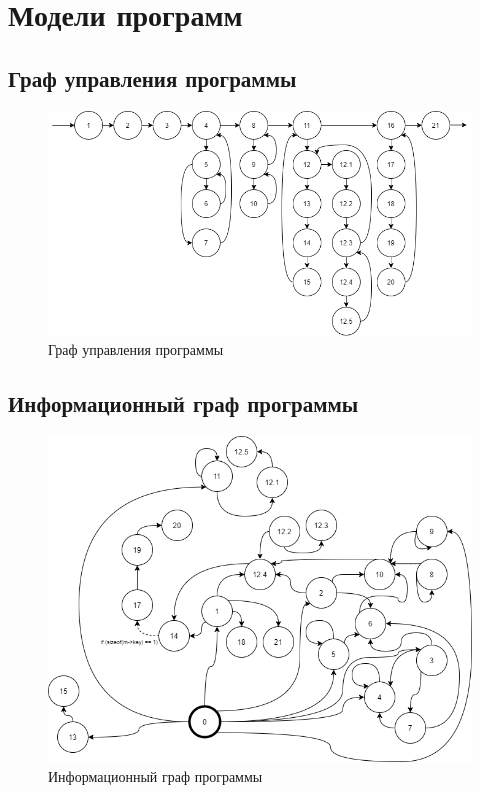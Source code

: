 \documentclass[12pt]{report}
\begin{document}
\chapter{Модели программ}

\section{Граф управления программы}

\begin{figure}[hp!]
	\centering
	\includegraphics[scale=0.6]{report_files/control_graph.png}
	\caption{Граф управления программы}
	\label{fig:mpr}
\end{figure}
\newpage

\section{Информационный граф программы}

\begin{figure}[hp!]
	\centering
	\includegraphics[scale=0.7]{report_files/information_graph.png}
	\caption{Информационный граф программы}
	\label{fig:mpr}
\end{figure}
\newpage
\end{document}
